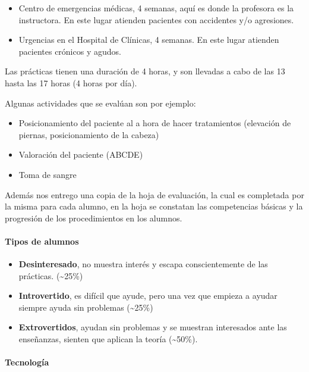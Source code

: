 \begin{itemize}
\itemsep1pt\parskip0pt
\item
  Centro de emergencias médicas, 4 semanas, aquí es donde la profesora
  es la instructora. En este lugar atienden pacientes con accidentes y/o
  agresiones.
\item
  Urgencias en el Hospital de Clínicas, 4 semanas. En este lugar
  atienden pacientes crónicos y agudos.
\end{itemize}

Las prácticas tienen una duración de 4 horas, y son llevadas a cabo de
las 13 hasta las 17 horas (4 horas por día).

Algunas actividades que se evalúan son por ejemplo:

\begin{itemize}
\itemsep1pt\parskip0pt
\item
  Posicionamiento del paciente al a hora de hacer tratamientos
  (elevación de piernas, posicionamiento de la cabeza)
\item
  Valoración del paciente (ABCDE)
\item
  Toma de sangre
\end{itemize}

Además nos entrego una copia de la hoja de evaluación, la cual es
completada por la misma para cada alumno, en la hoja se constatan las
competencias básicas y la progresión de los procedimientos en los
alumnos.

\paragraph{Tipos de alumnos}

\begin{itemize}
\itemsep1pt\parskip0pt
\item
  \textbf{Desinteresado}, no muestra interés y escapa conscientemente de
  las prácticas. (\textasciitilde{}25\%)
\item
  \textbf{Introvertido}, es difícil que ayude, pero una vez que empieza
  a ayudar siempre ayuda sin problemas (\textasciitilde{}25\%)
\item
  \textbf{Extrovertidos}, ayudan sin problemas y se muestran interesados
  ante las enseñanzas, sienten que aplican la teoría
  (\textasciitilde{}50\%).
\end{itemize}

\paragraph{Tecnología}

